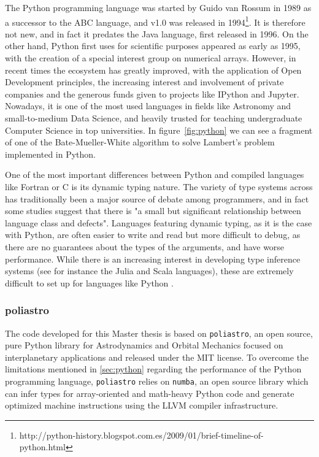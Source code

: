 The Python programming language was started by Guido van Rossum in 1989 as a successor to the ABC language, and v1.0 was released in 1994\footnote{http://python-history.blogspot.com.es/2009/01/brief-timeline-of-python.html}. It is therefore not new, and in fact it predates the Java language, first released in 1996. On the other hand, Python first uses for scientific purposes appeared as early as 1995, with the creation of a special interest group on numerical arrays\cite{millman2011python}. However, in recent times the ecosystem has greatly improved, with the application of Open Development principles, the increasing interest and involvement of private companies and the generous funds given to projects like IPython\cite{perez2007ipython} and Jupyter. Nowadays, it is one of the most used languages in fields like Astronomy\cite{momcheva2015software} and small-to-medium Data Science, and heavily trusted for teaching undergraduate Computer Science in top universities\cite{guo2014python}. In figure~\ref{fig:python} we can see a fragment of one of the Bate-Mueller-White algorithm to solve Lambert's problem implemented in Python.

One of the most important differences between Python and compiled languages like Fortran or C is its dynamic typing nature. The variety of type systems across has traditionally been a major source of debate among programmers, and in fact some studies suggest that there is "a small but significant relationship between language class and defects"\cite{ray2014quality}. Languages featuring dynamic typing, as it is the case with Python, are often easier to write and read but more difficult to debug, as there are no guarantees about the types of the arguments, and have worse performance. While there is an increasing interest in developing type inference systems (see for instance the Julia and Scala languages), these are extremely difficult to set up for languages like Python \cite{cannon2005localized}.

\subsubsection{poliastro}

The code developed for this Master thesis is based on \verb|poliastro|, an open source, pure Python library for Astrodynamics and Orbital Mechanics focused on interplanetary applications and released under the MIT license\cite{cano2017poliastro060}. To overcome the limitations mentioned in \ref{sec:python} regarding the performance of the Python programming language, \verb|poliastro| relies on \verb|numba|, an open source library which can infer types for array-oriented and math-heavy Python code and generate optimized machine instructions using the LLVM compiler infrastructure\cite{numba}.

